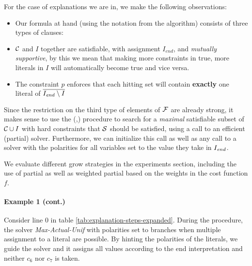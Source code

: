 For the case of explanations we are in, we make the following observations: 
\begin{itemize}
 \item Our formula at hand (using the notation from the \onestepo algorithm) consists of three types of clauses: 
 \item $\mathcal{C} $ and $I$ together are satisfiable, with assignment $I_{end}$, and \emph{mutually supportive}, by this we mean that making more constraints in \formulac true, more literals in $I$ will automatically become true and vice versa. 
 \item The constraint $p$ enforces that each hitting set will contain \textbf{exactly} one literal of  $\overline{I_\mathit{end} \setminus I}$
\end{itemize}
Since the restriction on the third type of elements of $\mathcal{F} $ are already strong, it makes sense to use the \grow(,\F) procedure to search for a \emph{maximal} satisfiable subset of $\mathcal{C} \cup I$ with hard constraints that $\mathcal{S}$ should be satisfied, using a call to an efficient  (partial) \maxsat solver. Furthermore, we can initialize this call as well as any call to a \sat solver with the polarities for all variables set to the value they take in $I_\mathit{end} $. %

We evaluate different grow strategies in the experiments section, including the use of partial \maxsat as well as weighted partial \maxsat based on the weights in the cost function $f$.

\paragraph{Example 1 (cont.)} Consider line 0 in table \ref{tab:explanation-steps-expanded}. During the \grow procedure, the \maxsat solver \emph{Max-Actual-Unif} with polarities set to \Iend branches when multiple assignment to a literal are possible. By hinting the polarities of the literals, we guide the solver and it assigns all values according to the end interpretation and neither $c_6$ nor $c_7$ is taken.

